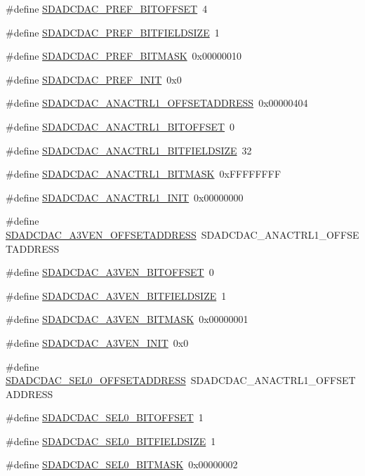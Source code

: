 \begin{DoxyCompactItemize}
\#define \hyperlink{a00569_a084a0cf9da8cc7f71330286b711892b2}{SDADCDAC\_\-PREF\_\-BITOFFSET}~4
\item 
\#define \hyperlink{a00569_ac89972bf74e99027784f990a4dfe5ea0}{SDADCDAC\_\-PREF\_\-BITFIELDSIZE}~1
\item 
\#define \hyperlink{a00569_ad69b7e96974048c7eb21c0cd376eabd8}{SDADCDAC\_\-PREF\_\-BITMASK}~0x00000010
\item 
\#define \hyperlink{a00569_acec9bd9e4f7a51b6fdda95e18c82ca59}{SDADCDAC\_\-PREF\_\-INIT}~0x0
\item 
\#define \hyperlink{a00569_abcd07285c223b1af13dd64acc44a106c}{SDADCDAC\_\-ANACTRL1\_\-OFFSETADDRESS}~0x00000404
\item 
\#define \hyperlink{a00569_a6203c992a874250230af562c35b194a6}{SDADCDAC\_\-ANACTRL1\_\-BITOFFSET}~0
\item 
\#define \hyperlink{a00569_aa74aeae1b5835bfc13b8d2969cc50002}{SDADCDAC\_\-ANACTRL1\_\-BITFIELDSIZE}~32
\item 
\#define \hyperlink{a00569_ab932be502a6acbb3031cb9e123b0f2de}{SDADCDAC\_\-ANACTRL1\_\-BITMASK}~0xFFFFFFFF
\item 
\#define \hyperlink{a00569_a864da2cddc901d76ec9b19474cb72004}{SDADCDAC\_\-ANACTRL1\_\-INIT}~0x00000000
\item 
\#define \hyperlink{a00569_a6a33aa0edb96b03042e216b134afadb9}{SDADCDAC\_\-A3VEN\_\-OFFSETADDRESS}~SDADCDAC\_\-ANACTRL1\_\-OFFSETADDRESS
\item 
\#define \hyperlink{a00569_ae7947c397a566a6814e561e67d3a8d76}{SDADCDAC\_\-A3VEN\_\-BITOFFSET}~0
\item 
\#define \hyperlink{a00569_a88146829571d1c8185a8bb52d43c0dfc}{SDADCDAC\_\-A3VEN\_\-BITFIELDSIZE}~1
\item 
\#define \hyperlink{a00569_ac926d8934a7f1415883e721b09769e38}{SDADCDAC\_\-A3VEN\_\-BITMASK}~0x00000001
\item 
\#define \hyperlink{a00569_a7742e2dcef1114db559fb79f79748fbe}{SDADCDAC\_\-A3VEN\_\-INIT}~0x0
\item 
\#define \hyperlink{a00569_aa1938bd4b1f6bfe8638443824e7713b6}{SDADCDAC\_\-SEL0\_\-OFFSETADDRESS}~SDADCDAC\_\-ANACTRL1\_\-OFFSETADDRESS
\item 
\#define \hyperlink{a00569_a800e8c9ad36d45ef18104023ee5c86e3}{SDADCDAC\_\-SEL0\_\-BITOFFSET}~1
\item 
\#define \hyperlink{a00569_aa0ca0601c612c3191ead2ced449def75}{SDADCDAC\_\-SEL0\_\-BITFIELDSIZE}~1
\item 
\#define \hyperlink{a00569_abfd376554fdf3b4a7bf6e257006c324b}{SDADCDAC\_\-SEL0\_\-BITMASK}~0x00000002

\end{DoxyCompactItemize}
